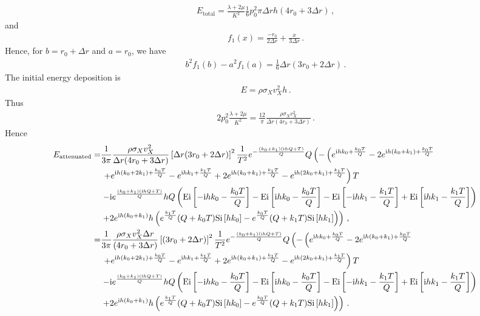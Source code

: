 \documentclass{article}
\newcommand*\te[1]{\text{#1}}
\newcommand*\p[1]{\left(#1\right)}
\newcommand*\ps[1]{\left[#1\right]}
\newcommand*\f[2]{\frac{#1}{#2}}
\newcommand*\I{\te{i}}
\begin{document}
\begin{align}
E_{\te{total}}=\f{\lambda+2\mu}{K^2}\f16 p_0^2 \pi\Delta r h(4 r_0+3\Delta r)\,,
\end{align}
and
\begin{align}
f_1(x)=\f{-r_0}{2\Delta r}+\f{x}{3\Delta r}\,.
\end{align}
Hence, for $b = r_0+\Delta r$ and $a = r_0$, we have
\begin{align}
b^2 f_1(b)-a^2f_1(a) = \f16\Delta r(3r_0+2\Delta r)\,.
\end{align}
The initial energy deposition is
\begin{align}
E = \rho\sigma_Xv_X^2h\,.
\end{align}
Thus
\begin{align}
2p_0^2\f{\lambda+2\mu}{K^2} =  \f{12}{\pi}\f{\rho\sigma_Xv_X^2}{\Delta r (4r_0+3\Delta r)}\,.
\end{align}
Hence
\begin{align}
\notag E_{\te{attenuated}} =&\f{1}{3\pi}\f{\rho\sigma_Xv_X^2}{\Delta r (4r_0+3\Delta r)}\ps{ \Delta r(3r_0+2\Delta r)}^2 \f{1}{T^2}e^{-\f{(k_0+k_1)(\I h Q+T)}{Q}} Q\p{-\p{e^{\I h k_0+\f{k_0T}{Q}} \notag -2e^{\I h(k_0+k_1)+\f{k_0 T}{Q}} \right.\right.\\&\left.\left.+ e^{\I h(k_0 + 2k_1) + \f{k_0 T}{Q}} - e^{\I h k_1 \notag + \f{k_1 T}{Q}} + 2 e^{\I h(k_0 + k_1) + \f{k_1 T}{Q}} - e^{\I h(2k_0 + k_1)+\f{k_1 T}{Q}}}T \right.\\&\left.- \I \notag e^{\f{(k_0+k_1)(\I h Q + T)}{Q}}h Q\p{\te{Ei}\ps{-\I h k_0 - \f{k_0 T}{Q}} - \te{Ei}\ps{\I h k_0 - \f{k_0 T}{Q}} - \te{Ei}\ps{-\I h k_1 - \f{k_1 T}{Q}} + \te{Ei}\ps{\I h k_1 - \f{k_1 T}{Q}}   } \right.\\&\left.+ 2e^{\I h(k_0+k_1)} h \p{e^{\f{k_1 T}{Q}}(Q + k_0 T)\te{Si}\ps{h k_0} - e^{\f{k_0 T}{Q}}(Q + k_1 T)\te{Si}\ps{h k_1}}}\,,\\
=&\f{1}{3\pi}\f{\rho\sigma_Xv_X^2\Delta r}{(4r_0+3\Delta r)}\ps{(3r_0+2\Delta r)}^2 \f{1}{T^2}e^{-\f{(k_0+k_1)(\I h Q+T)}{Q}} Q\p{-\p{e^{\I h k_0+\f{k_0T}{Q}} \notag -2e^{\I h(k_0+k_1)+\f{k_0 T}{Q}} \right.\right.\\&\left.\left.+ e^{\I h(k_0 + 2k_1) + \f{k_0 T}{Q}} - e^{\I h k_1 \notag + \f{k_1 T}{Q}} + 2 e^{\I h(k_0 + k_1) + \f{k_1 T}{Q}} - e^{\I h(2k_0 + k_1)+\f{k_1 T}{Q}}}T \right.\\&\left.- \I \notag e^{\f{(k_0+k_1)(\I h Q + T)}{Q}}h Q\p{\te{Ei}\ps{-\I h k_0 - \f{k_0 T}{Q}} - \te{Ei}\ps{\I h k_0 - \f{k_0 T}{Q}} - \te{Ei}\ps{-\I h k_1 - \f{k_1 T}{Q}} + \te{Ei}\ps{\I h k_1 - \f{k_1 T}{Q}}   } \right.\\&\left.+ 2e^{\I h(k_0+k_1)} h \p{e^{\f{k_1 T}{Q}}(Q + k_0 T)\te{Si}\ps{h k_0} - e^{\f{k_0 T}{Q}}(Q + k_1 T)\te{Si}\ps{h k_1}}}\,.
\end{align}
\end{document}
